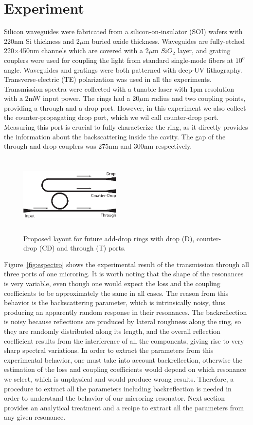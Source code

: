 \documentclass[conference,letterpaper,final]{IEEEtran}
\begin{document}
\section{Experiment}
Silicon waveguides were fabricated from a silicon-on-insulator (SOI) wafers with 220nm Si thickness and 2$\mu$m buried oxide thickness. Waveguides are fully-etched 220$\times$450nm channels which are covered with a 2$\mu$m $SiO_2$ layer, and grating couplers were used for coupling the light from standard single-mode fibers at $10^o$ angle. Waveguides and gratings were both patterned with deep-UV lithography. Transverse-electric (TE) polarization was used in all the experiments. Transmission spectra were collected with a tunable laser with 1pm resolution with a 2mW input power. The rings had a 20$\mu$m radius and two coupling points, providing a through and a drop port. However, in this experiment we also collect the counter-propagating drop port, which we wil call counter-drop port. Measuring this port is crucial to fully characterize the ring, as it directly provides the information about the backscattering inside the cavity. The gap of the through and drop couplers was 275nm and 300nm respectively. 
\begin{figure}[!t]
    \centering
    \includegraphics[width=0.45\textwidth,height=4cm]{add_drop_ring_new.eps}
    \caption{Proposed layout for future add-drop rings with drop (D), counter-drop (CD) and through (T) ports.}
    \label{fig:add_drop_ring}
\end{figure}

Figure~\ref{fig:espectro} shows the experimental result of the transmission through all three ports of one microring. It is worth noting that the shape of the resonances is very variable, even though one would expect the loss and the coupling coefficients to be approximately the same in all cases. The reason from this behavior is the backscattering parameter, which is intrinsically noisy, thus producing an apparently random response in their resonances. The backreflection is noisy because reflections are produced by lateral roughness along the ring, so they are randomly distributed along its length, and the overall reflection coefficient results from the interference of all the components, giving rise to very sharp spectral variations. In order to extract the parameters from this experimental behavior, one must take into account backreflection, otherwise the estimation of the loss and coupling coefficients would depend on which resonance we select, which is unphysical and would produce wrong results. Therefore, a procedure to extract all the parameters including backreflection is needed in order to understand the behavior of our microring resonator. Next section provides an analytical treatment and a recipe to extract all the parameters from any given resonance.
\end{document}
